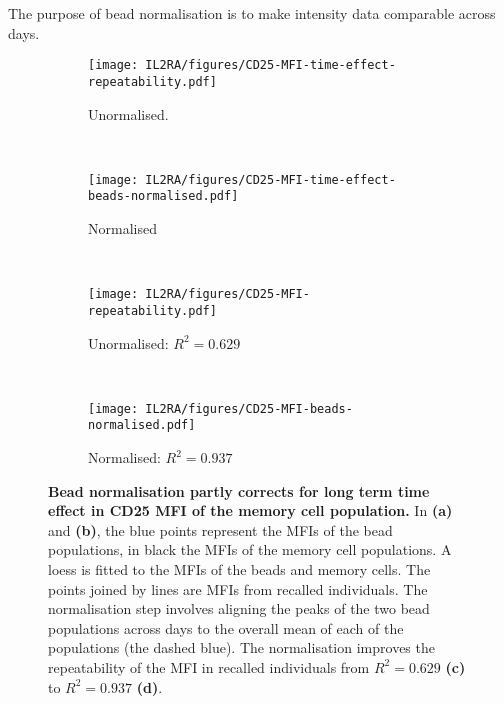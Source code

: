 The purpose of bead normalisation is to make intensity data comparable across days. 

\begin{figure}[ht]
    \begin{subfigure}[b]{.5\textwidth}
        \centering
        \texttt{[image: IL2RA/figures/CD25-MFI-time-effect-repeatability.pdf]}
        \caption{Unormalised.}
    \end{subfigure}
    ~
    \begin{subfigure}[b]{.5\textwidth}
        \centering
        \texttt{[image: IL2RA/figures/CD25-MFI-time-effect-beads-normalised.pdf]}
        \caption{Normalised}
    \end{subfigure}
    ~
    \begin{subfigure}[b]{.5\textwidth}
        \centering
        \texttt{[image: IL2RA/figures/CD25-MFI-repeatability.pdf]}
        \caption{Unormalised: $R^2=0.629$}
    \end{subfigure}
    ~
    \begin{subfigure}[b]{.5\textwidth}
        \centering
        \texttt{[image: IL2RA/figures/CD25-MFI-beads-normalised.pdf]}
        \caption{Normalised: $R^2=0.937$}
    \end{subfigure}
    \caption{ \label{figure:CD25-MFI-beads-normalised.pdf}
\textbf{Bead normalisation partly corrects for long term time effect in CD25 MFI of the memory cell population.}
In \textbf{(a)} and \textbf{(b)}, the blue points represent the MFIs of the bead populations, in black the MFIs of the memory cell populations.
A loess is fitted to the MFIs of the beads and memory cells.
The points joined by lines are MFIs from recalled individuals.
The normalisation step involves aligning the peaks of the two bead populations across days to the overall mean of each of the populations (the dashed blue).
The normalisation improves the repeatability of the MFI in recalled individuals from $R^2=0.629$ \textbf{(c)} to $R^2=0.937$ \textbf{(d)}.
}
\end{figure}




